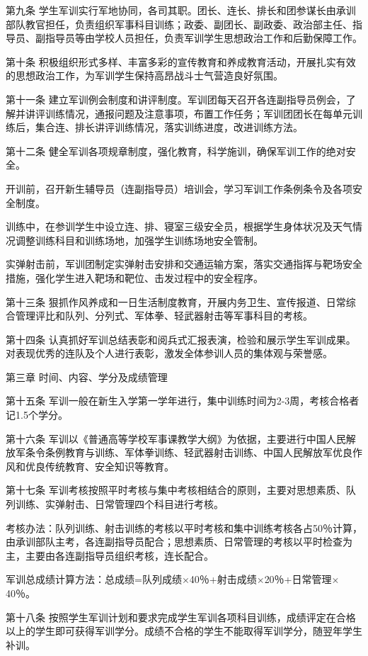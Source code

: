 \documentclass[UTF8,12pt,a4paper]{report}
\begin{document}
第九条 学生军训实行军地协同，各司其职。团长、连长、排长和团参谋长由承训部队教官担任，负责组织军事科目训练；政委、副团长、副政委、政治部主任、指导员、副指导员等由学校人员担任，负责军训学生思想政治工作和后勤保障工作。

第十条 积极组织形式多样、丰富多彩的宣传教育和养成教育活动，开展扎实有效的思想政治工作，为军训学生保持高昂战斗士气营造良好氛围。

第十一条 建立军训例会制度和讲评制度。军训团每天召开各连副指导员例会，了解并讲评训练情况，通报问题及注意事项，布置工作任务；军训团团长在每单元训练后，集合连、排长讲评训练情况，落实训练进度，改进训练方法。

第十二条 健全军训各项规章制度，强化教育，科学施训，确保军训工作的绝对安全。

开训前，召开新生辅导员（连副指导员）培训会，学习军训工作条例条令及各项安全制度。

训练中，在参训学生中设立连、排、寝室三级安全员，根据学生身体状况及天气情况调整训练科目和训练场地，加强学生训练场地安全管制。

实弹射击前，军训团制定实弹射击安排和交通运输方案，落实交通指挥与靶场安全措施，强化学生进入靶场和靶位、击发过程中的安全程序。

第十三条 狠抓作风养成和一日生活制度教育，开展内务卫生、宣传报道、日常综合管理评比和队列、分列式、军体拳、轻武器射击等军事科目的考核。

第十四条 认真抓好军训总结表彰和阅兵式汇报表演，检验和展示学生军训成果。对表现优秀的连队及个人进行表彰，激发全体参训人员的集体观与荣誉感。

第三章 时间、内容、学分及成绩管理

第十五条 军训一般在新生入学第一学年进行，集中训练时间为2-3周，考核合格者记1.5个学分。

第十六条 军训以《普通高等学校军事课教学大纲》为依据，主要进行中国人民解放军条令条例教育与训练、军体拳训练、轻武器射击训练、中国人民解放军优良作风和优良传统教育、安全知识等教育。

第十七条 军训考核按照平时考核与集中考核相结合的原则，主要对思想素质、队列训练、实弹射击、日常管理四个科目进行考核。

考核办法：队列训练、射击训练的考核以平时考核和集中训练考核各占50％计算，由承训部队主考，各连副指导员配合；思想素质、日常管理的考核以平时检查为主，主要由各连副指导员组织考核，连长配合。

军训总成绩计算方法：总成绩=队列成绩$\times$40％+射击成绩$\times$20％+日常管理$\times$40％。

第十八条 按照学生军训计划和要求完成学生军训各项科目训练，成绩评定在合格以上的学生即可获得军训学分。成绩不合格的学生不能取得军训学分，随翌年学生补训。
\end{document}
